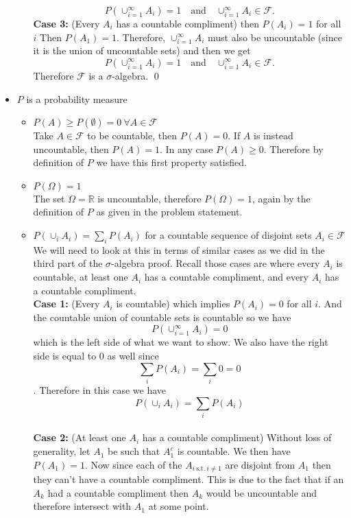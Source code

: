 \documentclass[10pt]{amsart}
\begin{document}
\begin{itemize}
\begin{itemize}
		$$ P\left(\cup_{i=1}^\infty A_i\right) = 1 \quad \text{and} \quad \cup_{i=1}^\infty A_i \in \mathcal{F}.$$
		\textbf{Case 3:} (Every $A_i$ has a countable compliment) then $P(A_i) = 1$ for all $i$
		Then $P(A_1) = 1$. Therefore, $\cup_{i=1}^\infty A_i$ must also be uncountable (since it is the union of uncountable sets) and then we get
		$$ P\left(\cup_{i=1}^\infty A_i\right) = 1 \quad \text{and} \quad \cup_{i=1}^\infty A_i \in \mathcal{F}.$$
		Therefore $\mathcal{F}$ is a $\sigma$-algebra. \qed
	\end{itemize}
\item $P$ is a probability measure
	\begin{itemize}
		\item $P(A) \geq P(\emptyset) = 0 \: \forall A \in \mathcal{F}$ \\
		Take $A \in \mathcal{F}$ to be countable, then $P(A) = 0$.
		If $A$ is instead uncountable, then $P(A) = 1$. In any case $P(A) \geq 0$.
		Therefore by definition of $P$ we have this first property satisfied.
		\item $P(\Omega) = 1$ \\
		The set $\Omega = \mathbb{R}$ is uncountable, therefore $P(\Omega) = 1$, again by the definition of $P$ as given in the problem statement.
		\item $P(\cup_i A_i) = \sum_i P(A_i)$ for a countable sequence of disjoint sets $A_i \in \mathcal{F}$ \\
		We will need to look at this in terms of similar cases as we did in the third part of the $\sigma$-algebra proof.
		Recall those cases are where every $A_i$ is countable, at least one $A_i$ has a countable compliment, and every $A_i$ has a countable compliment. \\
		\textbf{Case 1:} (Every $A_i$ is countable) which implies $P(A_i) = 0$ for all $i$. 
		And the countable union of countable sets is countable so we have
		$$P\left(\cup_{i=1}^\infty A_i\right) = 0$$
		which is the left side of what we want to show.
		We also have the right side is equal to 0 as well since
		$$\sum_i P(A_i) = \sum_i 0 = 0$$.
		Therefore in this case we have
		$$P(\cup_i A_i) = \sum_i P(A_i)$$ \\
		\textbf{Case 2:} (At least one $A_i$ has a countable compliment) Without loss of generality, let $A_1$ be such that $A_1^c$ is countable.
		We then have $P(A_1) = 1.$
		Now since each of the $A_{i \:\text{s.t.}\: i \neq 1}$ are disjoint from $A_1$ then they can't have a countable compliment.
		This is due to the fact that if an $A_k$ had a countable compliment then $A_k$ would be uncountable and therefore intersect with $A_1$ at some point.

\end{itemize}
\end{itemize}
\end{document}
